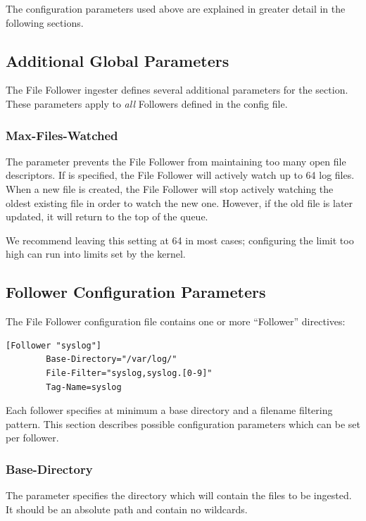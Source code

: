 The configuration parameters used above are explained in greater detail
in the following sections.

\subsection{Additional Global Parameters}

The File Follower ingester defines several additional parameters for
the \code{[Global]} section. These parameters apply to \emph{all} Followers
defined in the config file.

\subsubsection{Max-Files-Watched}

The  parameter prevents the File Follower from
maintaining too many open file descriptors. If
 is specified, the File Follower will actively
watch up to 64 log files. When a new file is created, the File Follower
will stop actively watching the oldest existing file in order to watch
the new one. However, if the old file is later updated, it will return
to the top of the queue.

We recommend leaving this setting at 64 in most cases; configuring the
limit too high can run into limits set by the kernel.

\subsection{Follower Configuration Parameters}

The File Follower configuration file contains one or more ``Follower''
directives:

\begin{Verbatim}[breaklines=true]
[Follower "syslog"]
        Base-Directory="/var/log/"
        File-Filter="syslog,syslog.[0-9]"
        Tag-Name=syslog
\end{Verbatim}

Each follower specifies at minimum a base directory and a filename
filtering pattern. This section describes possible configuration
parameters which can be set per follower.

\subsubsection{Base-Directory}

The  parameter specifies the directory which will
contain the files to be ingested. It should be an absolute path and
contain no wildcards.

